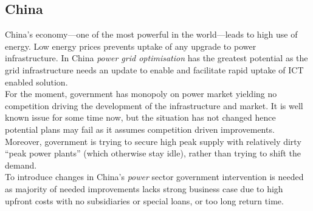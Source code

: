 \documentclass[11pt, twocolumn]{article}
\begin{document}
\subsection{China}
China's economy---one of the most powerful in the world---leads to high use of energy. Low energy prices prevents uptake of any upgrade to power infrastructure. In China \emph{power grid optimisation} has the greatest potential as the grid infrastructure needs an update to enable and facilitate rapid uptake of ICT enabled solution.\\
For the moment, government has monopoly on power market yielding no competition driving the development of the infrastructure and market. It is well known issue for some time now, but the situation has not changed hence potential plans may fail as it assumes competition driven improvements.\\
Moreover, government is trying to secure high peak supply with relatively dirty ``peak power plants'' (which otherwise stay idle), rather than trying to  shift the demand.\\
To introduce changes in China's \emph{power} sector government intervention is needed as majority of needed improvements lacks strong business case due to high upfront costs with no subsidiaries or special loans, or too long return time.\\
\end{document}
